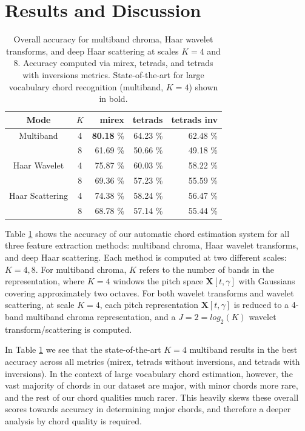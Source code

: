 \documentclass{article}
\begin{document}
\section{Results and Discussion}\label{sec:results}

\begin{table}[t]
	\begin{center}
	\begin{tabular} {| c | c | r | r | r |}
	\hline
	Mode & $K$ & mirex & tetrads & tetrads inv \\
	\hline
	Multiband & 4 & \textbf{80.18} \% & 64.23 \% & 62.48 \% \\
	& 8 & 61.69 \% & 50.66 \% & 49.18 \% \\
	
	Haar Wavelet & 4 & 75.87 \% & 60.03 \% & 58.22 \%\\
	 & 8 & 69.36 \% & 57.23 \% & 55.59 \% \\
	 
	 Haar Scattering & 4 & 74.38 \% & 58.24 \% & 56.47 \% \\
	  & 8 & 68.78 \% & 57.14 \% & 55.44 \% \\
	\hline
	\end{tabular}
	\end{center}
	\protect\caption{Overall accuracy for multiband chroma, Haar wavelet transforms, and deep Haar scattering at scales $K=4$ and $8$. Accuracy computed via mirex, tetrads, and tetrads with inversions 	metrics. State-of-the-art for large vocabulary chord recognition (multiband, $K=4$) shown in 		bold. 
	\label{table:overall-scores}}
\end{table}

Table \ref{table:overall-scores} shows the accuracy of our automatic chord estimation system for all three feature extraction methods: multiband chroma, Haar wavelet transforms, and deep Haar scattering. Each method is computed at two different scales: $K=4,8$. For multiband chroma, $K$ refers to the number of bands in the representation, where $K=4$ windows the pitch space $\mathbf{X}[t, \gamma]$ with Gaussians covering approximately two octaves. For both wavelet transforms and wavelet scattering, at scale $K=4$, each pitch representation $\mathbf{X}[t,\gamma]$ is reduced to a 4-band multiband chroma representation, and a $J=2=log_2(K)$ wavelet transform/scattering is computed. 

In Table \ref{table:overall-scores} we see that the state-of-the-art $K=4$ multiband results in the best accuracy across all metrics (mirex, tetrads without inversions, and tetrads with inversions). In the context of large vocabulary chord estimation, however, the vast majority of chords in our dataset are major, with minor chords more rare, and the rest of our chord qualities much rarer. This heavily skews these overall scores towards accuracy in determining major chords, and therefore a deeper analysis by chord quality is required.
\end{document}
